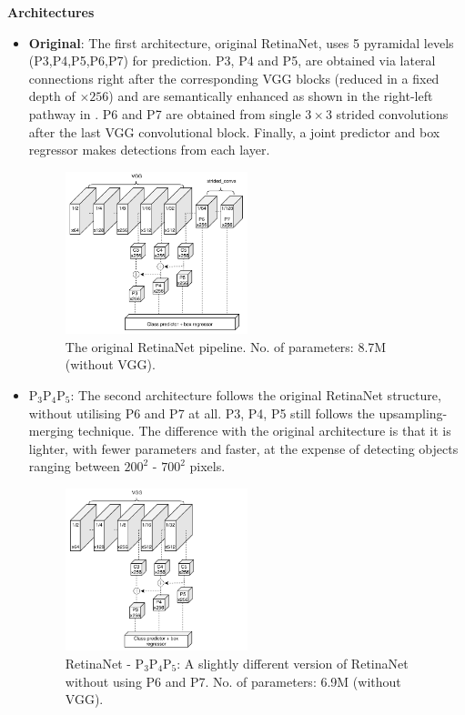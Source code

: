 \textbf{Architectures}
\begin{itemize}
 \item{\textbf{Original}:}\label{arch_1} 
The first architecture, original RetinaNet, uses 5 pyramidal levels (P3,P4,P5,P6,P7) for prediction. P3, P4 and P5, are obtained via lateral connections right after the corresponding VGG blocks (reduced in a fixed depth of $\times256$) and are semantically enhanced as shown in the right-left pathway in . P6 and P7 are obtained from single $3\times3$ strided convolutions after the last VGG convolutional block. Finally, a joint predictor and box regressor makes detections from each layer.

\begin{figure}[!htb]
  \centering
  \includegraphics[width=0.5\textwidth]{figures/ch4/fig3.pdf}
  \caption{The original RetinaNet pipeline. No. of parameters: 8.7M (without VGG).}
  \label{ch4:fig3}
\end{figure} 

 \item{\textbf{$\text{P}_3\text{P}_4\text{P}_5$}:}\label{arch_2}
The second architecture follows the original RetinaNet structure, without utilising P6 and P7 at all. P3, P4, P5 still follows the upsampling-merging technique. The difference with the original architecture is that it is lighter, with fewer parameters and faster, at the expense of detecting objects ranging between $200^2$ - $700^2$ pixels.

\begin{figure}[!htb]
  \centering
  \includegraphics[width=0.5\textwidth]{figures/ch4/fig4.pdf}
  \caption{RetinaNet - $\text{P}_3\text{P}_4\text{P}_5$: A slightly different version of RetinaNet without using P6 and P7. No. of parameters: 6.9M (without VGG).}
  \label{ch4:fig4}
\end{figure} 


\end{itemize}
